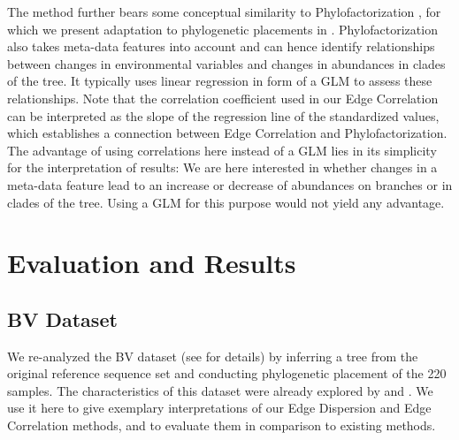 The method further bears some conceptual similarity to Phylofactorization \cite{Washburne2017a},
for which we present adaptation to phylogenetic placements in .
Phylofactorization also takes meta-data features into account and can hence identify relationships
between changes in environmental variables and changes in abundances in clades of the tree.
It typically uses linear regression in form of a \acf{GLM} to assess these relationships.
Note that the correlation coefficient used in our Edge Correlation
can be interpreted as the slope of the regression line of the standardized values,
which establishes a connection between Edge Correlation and Phylofactorization.
The advantage of using correlations here instead of a \ac{GLM} lies in its simplicity for the interpretation of results:
We are here interested in whether changes in a meta-data feature
lead to an increase or decrease of abundances on branches or in clades of the tree.
Using a \ac{GLM} for this purpose would not yield any advantage.


\section{Evaluation and Results}
\label{ch:Visualization:sec:Results}


\subsection{BV Dataset}
\label{ch:Visualization:sec:Results:sub:BVDataset}

We re-analyzed the \acf{BV} dataset (see  for details)
by inferring a tree from the original reference sequence set
and conducting phylogenetic placement of the \num{220} samples.
The characteristics of this dataset were already explored by  and .
We use it here to give exemplary interpretations of our Edge Dispersion and Edge Correlation methods,
and to evaluate them in comparison to existing methods.

